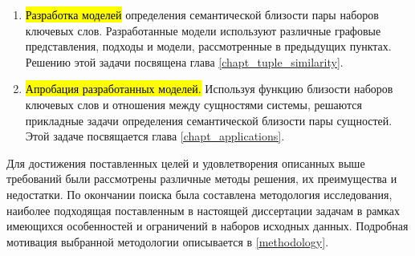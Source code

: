 \begin{itemize}
\begin{enumerate}
        \item \hl{Разработка моделей} определения семантической близости пары наборов ключевых слов. Разработанные модели используют различные графовые представления, подходы и модели, рассмотренные в предыдущих пунктах. Решению этой задачи посвящена глава \ref{chapt_tuple_similarity}.
        \item \hl{Апробация разработанных моделей.} Используя функцию близости наборов ключевых слов и отношения между сущностями системы, решаются прикладные задачи определения семантической близости пары сущностей. Этой задаче посвящается глава \ref{chapt_applications}.
        \end{enumerate}
\end{itemize}

Для достижения поставленных целей и удовлетворения описанных выше требований были рассмотрены различные методы решения, их преимущества и недостатки. По окончании поиска была составлена методология исследования,  наиболее подходящая поставленным в настоящей диссертации задачам в рамках имеющихся особенностей и ограничений в наборов исходных данных. Подробная мотивация выбранной методологии описывается в \ref{methodology}.


